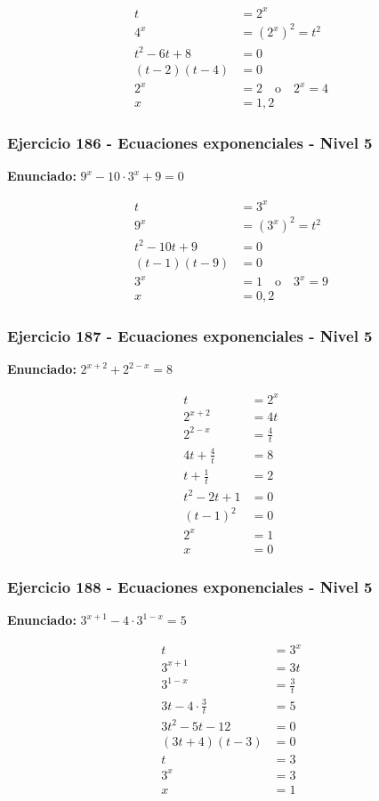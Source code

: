 \documentclass[12pt,a4paper]{article}
\begin{document}
\[
\begin{aligned}
t&=2^x\\
4^x&=(2^x)^2=t^2\\
t^2-6t+8&=0\\
(t-2)(t-4)&=0\\
2^x&=2\quad \text{o}\quad 2^x=4\\
x&=\boxed{1,2}
\end{aligned}
\]


\subsubsection*{Ejercicio 186 - Ecuaciones exponenciales - Nivel 5}
\textbf{Enunciado:} \(9^x-10\cdot 3^x+9=0\)

\[
\begin{aligned}
t&=3^x\\
9^x&=(3^x)^2=t^2\\
t^2-10t+9&=0\\
(t-1)(t-9)&=0\\
3^x&=1\quad \text{o}\quad 3^x=9\\
x&=\boxed{0,2}
\end{aligned}
\]


\subsubsection*{Ejercicio 187 - Ecuaciones exponenciales - Nivel 5}
\textbf{Enunciado:} \(2^{x+2}+2^{2-x}=8\)

\[
\begin{aligned}
t&=2^x\\
2^{x+2}&=4t\\
2^{2-x}&=\frac4t\\
4t+\frac4t&=8\\
t+\frac1t&=2\\
t^2-2t+1&=0\\
(t-1)^2&=0\\
2^x&=1\\
x&=\boxed{0}
\end{aligned}
\]


\subsubsection*{Ejercicio 188 - Ecuaciones exponenciales - Nivel 5}
\textbf{Enunciado:} \(3^{x+1}-4\cdot 3^{1-x}=5\)

\[
\begin{aligned}
t&=3^x\\
3^{x+1}&=3t\\
3^{1-x}&=\frac3t\\
3t-4\cdot\frac3t&=5\\
3t^2-5t-12&=0\\
(3t+4)(t-3)&=0\\
t&=3\\
3^x&=3\\
x&=\boxed{1}
\end{aligned}
\]
\end{document}
